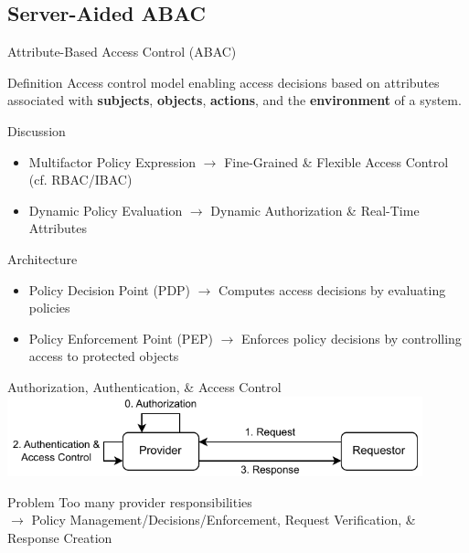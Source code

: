 \documentclass[en]{sdqbeamer}
\begin{document}
\subsection{Server-Aided ABAC}
\begin{frame}{Attribute-Based Access Control (ABAC)}
    \begin{greenblock}{Definition \parencite{JTF2020}}
        Access control model enabling access decisions based on attributes associated with \textbf{subjects}, \textbf{objects}, \textbf{actions}, and the \textbf{environment} of a system.
    \end{greenblock}

    \begin{blueblock}{Discussion \parencite{Hu2014}}
        \begin{itemize}
            \item Multifactor Policy Expression $\rightarrow$ Fine-Grained \& Flexible Access Control (cf. RBAC/IBAC)
            \item Dynamic Policy Evaluation $\rightarrow$ Dynamic Authorization \& Real-Time Attributes
        \end{itemize}
    \end{blueblock}

    \begin{grayblock}{Architecture \parencite{Hu2014,Oasis2013}}
        \begin{itemize}
            \item Policy Decision Point (PDP) $\rightarrow$ Computes access decisions by evaluating policies
            \item Policy Enforcement Point (PEP) $\rightarrow$ Enforces policy decisions by controlling access to protected objects
        \end{itemize}
    \end{grayblock}
\end{frame}

\begin{frame}{Authorization, Authentication, \& Access Control}
    \centering
	\includegraphics[width=0.9\textwidth]{./figures/access_control_request_traditional.drawio.pdf}
    \begin{redblock}{Problem}
        Too many provider responsibilities
        \\$\rightarrow$ Policy Management/Decisions/Enforcement, Request Verification, \& Response Creation
    \end{redblock}
\end{frame}
\end{document}
